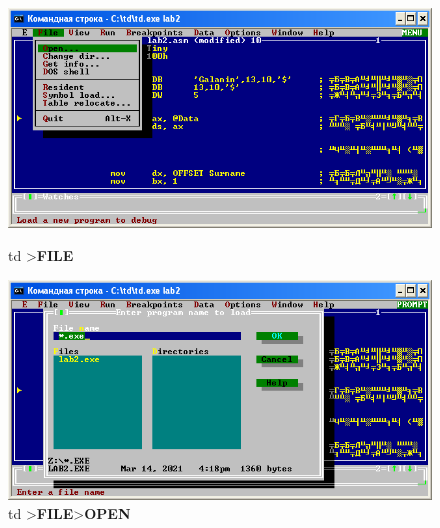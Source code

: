 \begin{figure}[!htp]
    \centering
    \begin{minipage}{0.48\textwidth}
        \centering
        \includegraphics[width=.98\linewidth]
            {../_INCLUDES/task-4-6-1/td-file.png}
        \caption{td >\textbf{FILE}}
        \label{fig:task_4_6_1__td_file}
    \end{minipage}
    \begin {minipage}{0.48\textwidth}
        \centering
        \includegraphics[width=.98\linewidth]
            {../_INCLUDES/task-4-6-1/td-file-open.png}
        \caption{td >\textbf{FILE}>\textbf{OPEN}}
        \label{fig:task_4_6_1__td_file_open}
    \end{minipage}
\end{figure}
